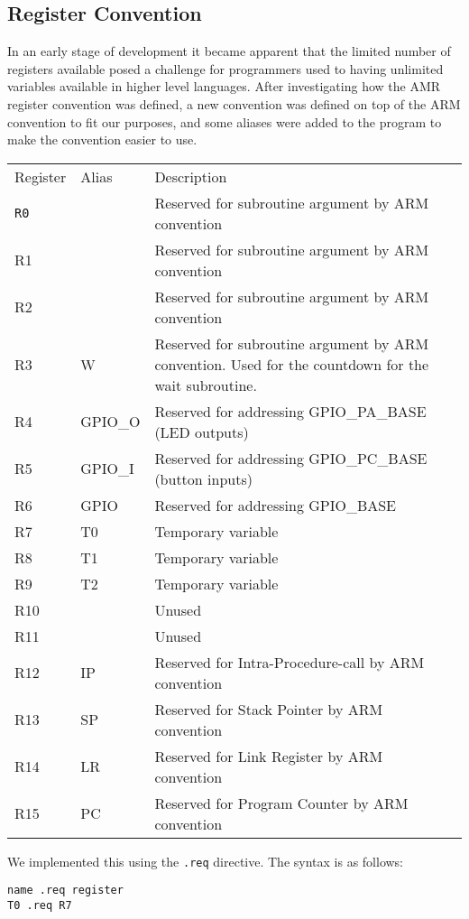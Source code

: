 \subsection{Register Convention}

In an early stage of development it became apparent that the limited number of registers available posed a challenge for programmers used to having unlimited variables available in higher level languages.
After investigating how the AMR register convention was defined, a new convention was defined on top of the ARM convention to fit our purposes, and some aliases were added to the program to make the convention easier to use.

\begin{table}[h!]
    \begin{tabular}{lll}
        Register & Alias   & Description                                            \\
        \texttt{R0}       & ~       & Reserved for subroutine argument by ARM convention     \\
        R1       & ~       & Reserved for subroutine argument by ARM convention     \\
        R2       & ~       & Reserved for subroutine argument by ARM convention     \\
        R3       & W       & Reserved for subroutine argument by ARM convention.
                             Used for the countdown for the wait subroutine.        \\
        R4       & GPIO\_O & Reserved for addressing GPIO\_PA\_BASE (LED outputs)   \\
        R5       & GPIO\_I & Reserved for addressing GPIO\_PC\_BASE (button inputs) \\
        R6       & GPIO    & Reserved for addressing GPIO\_BASE                     \\
        R7       & T0      & Temporary variable                                     \\
        R8       & T1      & Temporary variable                                     \\
        R9       & T2      & Temporary variable                                     \\
        R10      & ~       & Unused                                                 \\
        R11      & ~       & Unused                                                 \\
        R12      & IP      & Reserved for Intra-Procedure-call by ARM convention    \\
        R13      & SP      & Reserved for Stack Pointer by ARM convention           \\
        R14      & LR      & Reserved for Link Register  by ARM convention          \\
        R15      & PC      & Reserved for Program Counter by ARM convention    \\
    \end{tabular}
\end{table}

We implemented this using the \texttt{.req} directive. The syntax is as follows:

\begin{lstlisting}[label=register-aliasing,caption=Register aliasing]
name .req register
T0 .req R7
\end{lstlisting}

